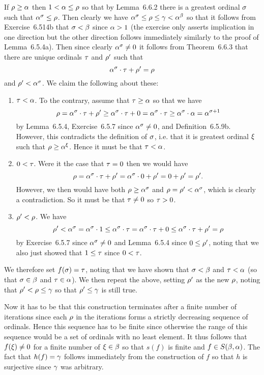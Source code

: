 {{    If $\rho \geq \alpha$ then $1 < \alpha \leq \rho$ so that by Lemma~6.6.2 there is a greatest ordinal $\sigma$ such that $\alpha^\sigma \leq \rho$.
    Then clearly we have $\alpha^\sigma \leq \rho \leq \gamma < \alpha^\beta$ so that it follows from Exercise~6.514b that $\sigma < \beta$ since $\alpha > 1$ (the exercise only asserts implication in one direction but the other direction follows immediately similarly to the proof of Lemma~6.5.4a).
    Then since clearly $\alpha^\sigma \neq 0$ it follows from Theorem~6.6.3 that there are unique ordinals $\tau$ and $\rho'$ such that
    $$
      \alpha^\sigma \cdot \tau + \rho' = \rho
    $$
    and $\rho' < \alpha^\sigma$.
    We claim the following about these:
    \begin{enumerate}
      \item $\tau < \alpha$.
            To the contrary, assume that $\tau \geq \alpha$ so that we have
            $$
              \rho = \alpha^\sigma \cdot \tau + \rho' \geq \alpha^\sigma \cdot \tau + 0 = \alpha^\sigma \cdot \tau \geq \alpha^\sigma \cdot \alpha = \alpha^{\sigma + 1}
            $$
            by Lemma~6.5.4, Exercise~6.5.7 since $\alpha^\sigma \neq 0$, and Definition~6.5.9b.
            However, this contradicts the definition of $\sigma$, i.e. that it is greatest ordinal $\xi$ such that $\rho \geq \alpha^\xi$.
            Hence it must be that $\tau < \alpha$.

      \item $0 < \tau$.
            Were it the case that $\tau = 0$ then we would have
            $$
              \rho = \alpha^\sigma \cdot \tau + \rho' = \alpha^\sigma \cdot 0 + \rho' = 0 + \rho' = \rho'.
            $$
            However, we then would have both $\rho \geq \alpha^\sigma$ and $\rho = \rho' < \alpha^\sigma$, which is clearly a contradiction.
            So it must be that $\tau \neq 0$ so $\tau > 0$.

      \item $\rho' < \rho$.
            We have
            $$
              \rho' < \alpha^\sigma = \alpha^\sigma \cdot 1 \leq \alpha^\sigma \cdot \tau = \alpha^\sigma \cdot \tau + 0 \leq \alpha^\sigma \cdot \tau + \rho' = \rho
            $$
            by Exercise~6.5.7 since $\alpha^\sigma \neq 0$ and Lemma~6.5.4 since $0 \leq \rho'$, noting that we also just showed that $1 \leq \tau$ since $0 < \tau$.
    \end{enumerate}

    We therefore set $f(\sigma) = \tau$, noting that we have shown that $\sigma < \beta$ and $\tau < \alpha$ (so that $\sigma \in \beta$ and $\tau \in \alpha$).
    We then repeat the above, setting $\rho'$ as the new $\rho$, noting that $\rho' < \rho \leq \gamma$ so that $\rho' \leq \gamma$ is still true.

    Now it has to be that this construction terminates after a finite number of iterations since each $\rho$ in the iterations forms a strictly decreasing sequence of ordinals.
    Hence this sequence has to be finite since otherwise the range of this sequence would be a set of ordinals with no least element.
    It thus follows that $f(\xi) \neq 0$ for a finite number of $\xi \in \beta$ so that $s(f)$ is finite and $f \in S(\beta,\alpha)$.
    The fact that $h(f) = \gamma$ follows immediately from the construction of $f$ so that $h$ is surjective since $\gamma$ was arbitrary.
  }

}
